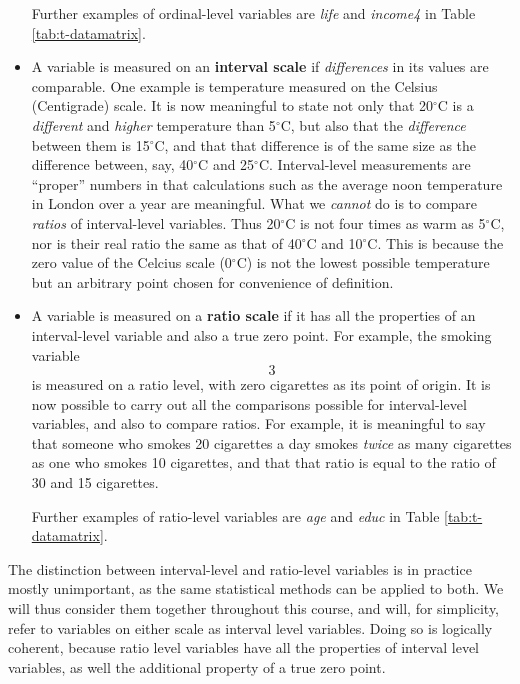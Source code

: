\documentclass[11pt,a4paper,openany]{book}
\begin{document}
\begin{itemize}
  Further examples of ordinal-level variables are \emph{life} and
  \emph{income4} in Table \ref{tab:t-datamatrix}.
\item
  A variable is measured on an \textbf{interval scale} if
  \emph{differences} in its values are comparable. One example is
  temperature measured on the Celsius (Centigrade) scale. It is now
  meaningful to state not only that 20\(^{\circ}\)C is a
  \emph{different} and \emph{higher} temperature than 5\(^{\circ}\)C,
  but also that the \emph{difference} between them is 15\(^{\circ}\)C,
  and that that difference is of the same size as the difference
  between, say, 40\(^{\circ}\)C and 25\(^{\circ}\)C. Interval-level
  measurements are ``proper'' numbers in that calculations such as the
  average noon temperature in London over a year are meaningful. What we
  \emph{cannot} do is to compare \emph{ratios} of interval-level
  variables. Thus 20\(^{\circ}\)C is not four times as warm as
  5\(^{\circ}\)C, nor is their real ratio the same as that of
  40\(^{\circ}\)C and 10\(^{\circ}\)C. This is because the zero value of
  the Celcius scale (0\(^{\circ}\)C) is not the lowest possible
  temperature but an arbitrary point chosen for convenience of
  definition.
\item
  A variable is measured on a \textbf{ratio scale} if it has all the
  properties of an interval-level variable and also a true zero point.
  For example, the smoking variable \[3\] is measured on a ratio level,
  with zero cigarettes as its point of origin. It is now possible to
  carry out all the comparisons possible for interval-level variables,
  and also to compare ratios. For example, it is meaningful to say that
  someone who smokes 20 cigarettes a day smokes \emph{twice} as many
  cigarettes as one who smokes 10 cigarettes, and that that ratio is
  equal to the ratio of 30 and 15 cigarettes.

  Further examples of ratio-level variables are \emph{age} and
  \emph{educ} in Table \ref{tab:t-datamatrix}.
\end{itemize}

The distinction between interval-level and ratio-level variables is in
practice mostly unimportant, as the same statistical methods can be
applied to both. We will thus consider them together throughout this
course, and will, for simplicity, refer to variables on either scale as
interval level variables. Doing so is logically coherent, because ratio
level variables have all the properties of interval level variables, as
well the additional property of a true zero point.
\end{document}
